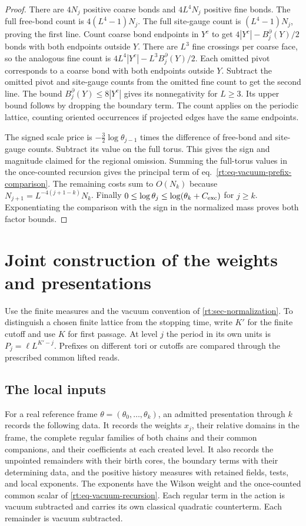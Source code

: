 \documentclass[11pt,letterpaper,reqno]{amsart}
\numberwithin{equation}{section}
\renewcommand{\eqref}[1]{\textup{eq.~\ref{#1}}}
\theoremstyle{definition}
\theoremstyle{remark}
\begin{document}
\begin{proof}
There are $4N_j$ positive coarse bonds and $4L^4N_j$ positive
fine bonds. The full free-bond count is $4(L^4-1)N_j$. The full
site-gauge count is $(L^4-1)N_j$, proving the first line.
Count coarse bond endpoints in $Y^c$ to get
$4|Y^c|-B_j^\partial(Y)/2$ bonds with both endpoints outside $Y$. There
are $L^3$ fine crossings per coarse face, so the analogous fine
count is $4L^4|Y^c|-L^3B_j^\partial(Y)/2$. Each omitted pivot corresponds
to a coarse bond with both endpoints outside $Y$. Subtract the
omitted pivot and site-gauge counts from the omitted fine count
to get the second line. The bound $B_j^\partial(Y)\le8|Y^c|$ gives its
nonnegativity for $L\ge3$. Its upper bound follows by dropping the
boundary term. The count applies on the periodic lattice, counting
oriented occurrences if projected edges have the same endpoints.

The signed scale price is $-\tfrac32\log\theta_{j-1}$ times the
difference of free-bond and site-gauge counts. Subtract its value
on the full torus. This gives the sign and magnitude claimed for
the regional omission. Summing the full-torus values in the
once-counted recursion gives the principal term of
\eqref{rt:eq-vacuum-prefix-comparison}. The remaining costs sum
to $O(N_k)$ because $N_{j+1}=L^{-4(j+1-k)}N_k$. Finally
$0\le\log\theta_j\le\log(\theta_k+C_{\rm exc})$ for $j\ge k$.
Exponentiating the comparison with the sign in the normalized
mass proves both factor bounds.
\end{proof}

\section{Joint construction of the weights and presentations}
\label{rt:sec-joint-construction}

Use the finite measures and the vacuum convention of
\cref{rt:sec-normalization}. To distinguish a chosen finite lattice
from the stopping time, write \(K'\) for the finite cutoff and use
\(K\) for first passage. At level \(j\) the period in its own units
is \(P_j=\ell L^{K'-j}\). Prefixes on different tori or cutoffs
are compared through the prescribed common lifted reads.

\subsection{The local inputs}
\label{rt:subsec-local-inputs}

For a real reference frame \(\theta=(\theta_0,\ldots,\theta_k)\),
an admitted presentation through \(k\) records the following data.
It records the weights \(x_j\), their relative domains in the frame,
the complete regular families of both chains and their common
companions, and their coefficients at each created level. It also
records the unpointed remainders with their birth cores, the boundary
terms with their determining data, and the positive history measures
with retained fields, tests, and local exponents. The exponents have
the Wilson weight and the once-counted common scalar of
\cref{rt:eq-vacuum-recursion}. Each regular term in the action is
vacuum subtracted and carries its own classical quadratic
counterterm. Each remainder is vacuum subtracted.
\end{document}
